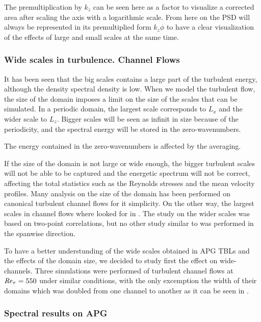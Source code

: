 The premultiplication by $k_z$ can be seen here as a factor to visualize a corrected area after scaling the axis with a logarithmic scale.
From here on the PSD will always be represented in its premultiplied form $k_z\phi$ to have a clear visualization of the effects of large and small scales at the same time.

\subsubsection{Wide scales in turbulence. Channel Flows}
It has been seen that the big scales contains a large part of the turbulent energy, although the density spectral density is low.
When we model the turbulent flow, the size of the domain imposes a limit on the size of the scales that can be simulated. In a periodic domain, the largest scale corresponds to $L_x$ and the wider scale to $L_z$. Bigger scales will be seen as infinit in size because of the periodicity, and the spectral energy will be stored in the zero-wavenumbers.

The energy contained in the zero-wavenumbers is affected by the averaging.

If the size of the domain is not large or wide enough, the bigger turbulent scales will not be able to be captured and the energetic spectrum will not be correct, affecting the total statistics such as the Reynolds stresses and the mean velocity profiles.
Many analysis on the size of the domain has been performed on canonical turbulent channel flows for it simplicity.
On the other way, the largest scales in channel flows where looked for in .
The study on the wider scales was based on two-point correlations, but no other study similar to  was performed in the spanwise direction.

To have a better understunding of the wide scales obtained in APG TBLs and the effects of the domain size, we decided to study first the effect on wide-channels.
Three simulations were performed of turbulent channel flows at $\mbox{\textit{Re}}_{\tau} = 550 $ under similar conditions, with the only excemption the width of their domains which was doubled from one channel to another as it can be seen in .
 


\subsubsection{Spectral results on APG}

